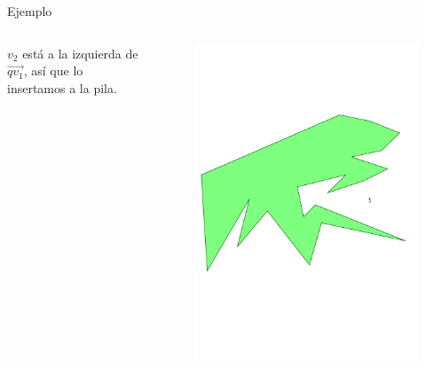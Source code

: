 \documentclass[aspectratio=169,xcolor=dvipsnames, t]{beamer}
\begin{document}
\begin{frame}{Ejemplo}
  \begin{columns}
    \begin{column}{0.3\textwidth}
      \raggedright %
      $v_{2}$ está a la izquierda de $\overrightarrow{qv_{1}}$, así que lo insertamos a la pila.
    \end{column}
    \begin{column}{0.7\textwidth}
      \vspace{-2.5cm} %
      \begin{figure}
        \centering
        \includegraphics[width=1\linewidth, height=.95\textheight, page=11, keepaspectratio]{IPE/point_visibility.pdf}
      \end{figure}
    \end{column}
  \end{columns}
\end{frame}
\end{document}
